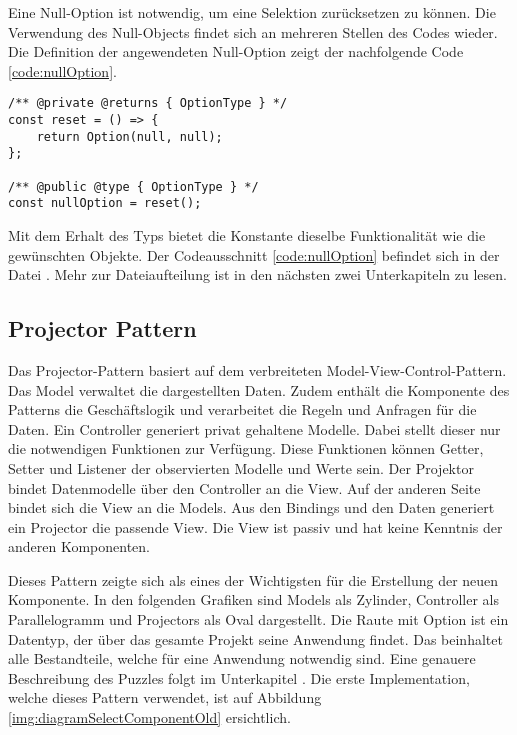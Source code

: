 Eine Null-Option ist notwendig, um eine Selektion zurücksetzen zu können. 
Die Verwendung des Null-Objects findet sich an mehreren Stellen des Codes wieder. 
Die Definition der angewendeten Null-Option zeigt der nachfolgende Code \ref{code:nullOption}. 

\begin{lstlisting}[style = htmlcssjs, caption = Null-Option Definition, label = code:nullOption]
/** @private @returns { OptionType } */
const reset = () => {
    return Option(null, null);
};

/** @public @type { OptionType } */
const nullOption = reset();
\end{lstlisting}

Mit dem Erhalt des Typs  bietet die Konstante dieselbe Funktionalität wie die gewünschten Objekte. 
Der Codeausschnitt \ref{code:nullOption} befindet sich in der Datei . 
Mehr zur Dateiaufteilung ist in den nächsten zwei Unterkapiteln zu lesen. 


\subsection{Projector Pattern}
\label{sec:projectorPattern}

Das Projector-Pattern basiert auf dem verbreiteten Model-View-Control-Pattern. 
Das Model verwaltet die dargestellten Daten. 
Zudem enthält die Komponente des Patterns die Geschäftslogik und verarbeitet die Regeln und Anfragen für die Daten. 
Ein Controller generiert privat gehaltene Modelle. 
Dabei stellt dieser nur die notwendigen Funktionen zur Verfügung. 
Diese Funktionen können Getter, Setter und Listener der observierten Modelle und Werte sein. 
Der Projektor bindet Datenmodelle über den Controller an die View. 
Auf der anderen Seite bindet sich die View an die Models. 
Aus den Bindings und den Daten generiert ein Projector die passende View. 
Die View ist passiv und hat keine Kenntnis der anderen Komponenten. 

Dieses Pattern zeigte sich als eines der Wichtigsten für die Erstellung der neuen Komponente. 
In den folgenden Grafiken sind Models als Zylinder, Controller als Parallelogramm und Projectors als Oval dargestellt.
Die Raute mit Option ist ein Datentyp, der über das gesamte Projekt seine Anwendung findet. 
Das  beinhaltet alle Bestandteile, welche für eine Anwendung notwendig sind. 
Eine genauere Beschreibung des Puzzles folgt im Unterkapitel \textbf{}. 
Die erste Implementation, welche dieses Pattern verwendet, ist auf Abbildung \ref{img:diagramSelectComponentOld} ersichtlich. 

